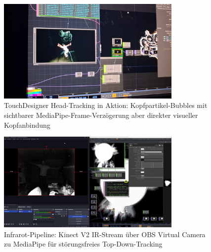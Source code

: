 \begin{figure}[htbp]
    \centering
    \includegraphics[width=0.8\textwidth,height=0.4\textheight,keepaspectratio]{images/HeadTrackedBubblesInActionTouchDesignerPerspectiveslightMediaPipeFrameDelaySeeableButAlsoVisualsDirectlyAtHead.png}
    \caption{TouchDesigner Head-Tracking in Aktion: Kopfpartikel-Bubbles mit sichtbarer MediaPipe-Frame-Verzögerung aber direkter visueller Kopfanbindung}
    \label{fig:headtracking_bubbles_aktion}
\end{figure}


\begin{figure}[htbp]
    \centering
    \includegraphics[width=0.8\textwidth,height=0.4\textheight,keepaspectratio]{images/InfraRedOBSCameraToMediaPipeForTopDownCirlceGradeMapping.png}
    \caption{Infrarot-Pipeline: Kinect V2 IR-Stream über OBS Virtual Camera zu MediaPipe für störungsfreies Top-Down-Tracking}
    \label{fig:infrarot_topdown_mapping}
\end{figure}

